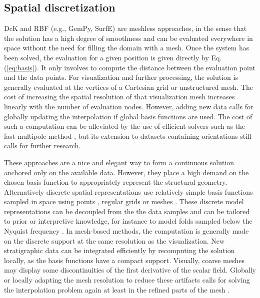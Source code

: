\documentclass[preprint]{ring20}
\begin{document}
\subsection{Spatial discretization}

DcK and RBF (e.g., GemPy, SurfE) are meshless approaches, in the sense that the solution has a high degree of smoothness and can be evaluated everywhere in space without the need for filling the domain with a mesh. Once the system has been solved, the evaluation for a given position is given directly by Eq. (\ref{eq:basis}). It only involves to compute the distance between the evaluation point and the data points. For visualization and further processing, the solution is generally evaluated at the vertices of a Cartesian grid or unstructured mesh. The cost of increasing the spatial resolution of that visualization mesh increases linearly with the number of evaluation nodes. However, adding new data calls for globally updating the interpolation if global basis functions are used. The cost of such a computation can be alleviated by the use of efficient solvers such as the fast multipole method \citep{greengard_fast_1987}, but its extension to datasets containing orientations still calls for further research. 

These approaches are a nice and elegant way to form a continuous solution anchored only on the available data. However, they place a high demand on the chosen basis function to appropriately represent the structural geometry. Alternatively discrete spatial representations use relatively simple basis functions sampled in space using points \citet[][, e.g., MSS]{Renaudeau2019MG}, regular grids \citep[][, e.g., SIGMA]{Irakarama2021MG} or meshes \citep[][, e.g., LoopStructural, SIGMA, StructuralLab] {Frank2007CG}. These discrete model representations can be decoupled from the the data samples and can be tailored to prior or interpretive knowledge, for instance to model folds sampled below the Nyquist frequency \citep{Grose2018JGRSE}. In mesh-based methods, the computation is generally made on the discrete support at the same resolution as the visualization. New stratigraphic data can be integrated efficiently by recomputing the solution locally, as the basis functions have a compact support. Visually, coarse meshes may display some discontinuities of the first derivative of the scalar field. Globally or locally adapting the mesh resolution to reduce these artifacts calls for solving the interpolation problem again at least in the refined parts of the mesh \citep{Frank2007CG}. 
\end{document}
